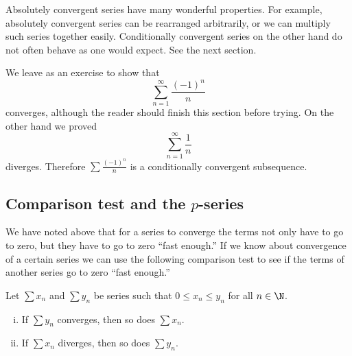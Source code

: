 \documentclass[12pt]{book}
\begin{document}
Absolutely convergent series have many wonderful properties.
For example, absolutely convergent
series can be rearranged arbitrarily, or we can multiply such
series together easily.
Conditionally convergent series on the other hand
do not often behave as one would expect.
See the next section.

We leave as an exercise to show that
\begin{equation*}
\sum_{n=1}^\infty \frac{{(-1)}^n}{n}
\end{equation*}
converges, although the reader should finish this section before trying.
On the other hand we proved
\begin{equation*}
\sum_{n=1}^\infty \frac{1}{n}
\end{equation*}
diverges.
Therefore 
$\sum \frac{{(-1)}^n}{n}$ is a conditionally convergent subsequence.

\subsection*{Comparison test and the \texorpdfstring{$p$}{p}-series}

We have noted above that for a series to converge
the terms not only have to go to zero, but they have to go to zero ``fast
enough.''  If we know about convergence of a certain series
we can use the following comparison test to see if the terms of another
series go to zero ``fast enough.''

\begin{prop}
Let $\sum x_n$ and $\sum y_n$ be series such that $0 \leq x_n \leq y_n$
for all $n \in \N$.
\begin{enumerate}[(i)]
\item If $\sum y_n$ converges, then so does $\sum x_n$.
\item If $\sum x_n$ diverges, then so does $\sum y_n$.
\end{enumerate}
\end{prop}
\end{document}
